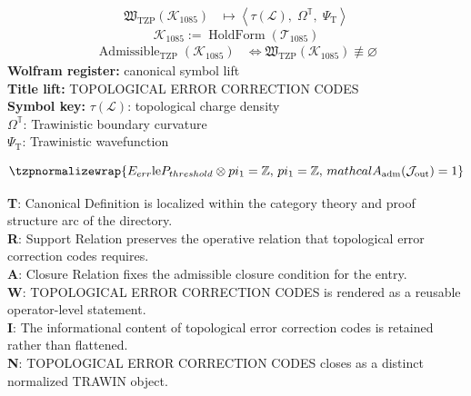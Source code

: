 \noindent
\begin{minipage}[t]{0.48\linewidth}
\begingroup
\small
\[
\begin{aligned}
\mathfrak{W}_{\mathrm{TZP}}\!\left(\mathcal{K}_{1085}\right)
&\longmapsto
\left\langle \tau(\mathcal{L}),\; \Omega^{\mathbb{T}},\; \Psi_{\mathrm{T}} \right\rangle
\end{aligned}
\]
\[
\mathcal{K}_{1085}
:=
\operatorname{HoldForm}\!\left(\mathcal{T}_{1085}\right)
\]
\[
\begin{aligned}
\operatorname{Admissible}_{\mathrm{TZP}}\!\left(\mathcal{K}_{1085}\right)
&\Longleftrightarrow
\mathfrak{W}_{\mathrm{TZP}}\!\left(\mathcal{K}_{1085}\right)\not\equiv\varnothing
\end{aligned}
\]
\textbf{Wolfram register:} canonical symbol lift\\
\textbf{Title lift:} TOPOLOGICAL ERROR CORRECTION CODES\\
\textbf{Symbol key:} \(\tau(\mathcal{L})\): topological charge density\\ \(\Omega^{\mathbb{T}}\): Trawinistic boundary curvature\\ \(\Psi_{\mathrm{T}}\): Trawinistic wavefunction
\par
\endgroup
\end{minipage}\hfill
\begin{minipage}[t]{0.48\linewidth}
\[
\tzpnormalizewrap{E_{err} \mathrm{le} P_{threshold} \otimes pi_1 = \mathbb{Z},\,pi_1 = \mathbb{Z},\,mathcal{A}_{\mathrm{adm}}\!\left(\mathcal{J}_{\mathrm{out}}\right)=1}
\]

\small
\textbf{T}: Canonical Definition is localized within the category theory and proof structure arc of the directory.\\
\textbf{R}: Support Relation preserves the operative relation that topological error correction codes requires.\\
\textbf{A}: Closure Relation fixes the admissible closure condition for the entry.\\
\textbf{W}: TOPOLOGICAL ERROR CORRECTION CODES is rendered as a reusable operator-level statement.\\
\textbf{I}: The informational content of topological error correction codes is retained rather than flattened.\\
\textbf{N}: TOPOLOGICAL ERROR CORRECTION CODES closes as a distinct normalized TRAWIN object.
\normalsize
\end{minipage}

